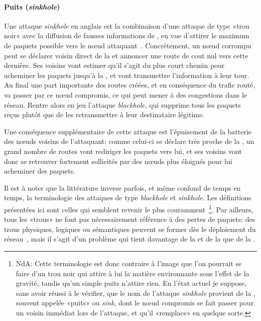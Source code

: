         \paragraph{Puits (\textit{sinkhole})}
Une attaque \textit{sinkhole} en anglais est la combinaison d'une attaque de type «trou noir» avec la diffusion de fausses informations de , en vue d'attirer le maximum de paquets possible vers le nœud attaquant~\cite{CT04}.
Concrètement, un nœud corrompu peut se déclarer voisin direct de la \sdb et annoncer une route de cout nul vers cette dernière.
Ses voisins vont estimer qu'il s'agit du plus court chemin pour acheminer les paquets jusqu'à la \sdb, et vont transmettre l'information à leur tour.
Au final une part importante des routes créées, et en conséquence du trafic routé, va passer par ce nœud compromis, ce qui peut mener à des congestions dans le réseau.
Rentre alors en jeu l'attaque \textit{blackhole}, qui supprime tous les paquets reçus plutôt que de les retransmettre à leur destinataire légitime.

Une conséquence supplémentaire de cette attaque est l'épuisement de la batterie des nœuds voisins de l'attaquant: comme celui-ci se déclare très proche de la \sdb, un grand nombre de routes vont rediriger les paquets vers lui, et ses voisins vont donc se retrouver fortement sollicités par des nœuds plus éloignés pour lui acheminer des paquets.

Il est à noter que la littérature inverse parfois, et même confond de temps en temps, la terminologie des attaques de type \textit{blackhole} et \textit{sinkhole}.
Les définitions présentées ici sont celles qui semblent revenir le plus couramment%
\,\footnote{%
    NdA: Cette terminologie est donc contraire à l'image que l'on pourrait se faire d'un trou noir qui attire à lui la matière environnante sous l'effet de la gravité, tandis qu'un simple puits n'attire rien.
    En l'état actuel je suppose, sans avoir réussi à le vérifier, que le nom de l'attaque \textit{sinkhole} provient de la \sdb, souvent appelée «puits» ou \textit{sink}, dont le nœud compromis se fait passer pour un voisin immédiat lors de l'attaque, et qu'il «remplace» en quelque sorte.%
}.
Par ailleurs, tous les «trous» ne font pas nécessairement référence à des pertes de paquets: des trous physiques, logiques ou sémantiques peuvent se former dès le déploiement du réseau~\cite{AKJ05,JSM13}, mais il s'agit d'un problème qui tient davantage de la  et de la \resilience que de la \secu.

